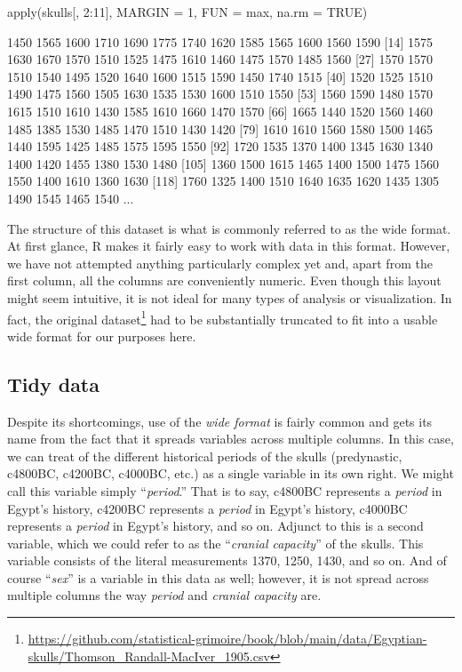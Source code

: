 \begin{inR}
apply(skulls[, 2:11], MARGIN = 1, FUN = max, na.rm = TRUE)
\end{inR}

\begin{outR}
  [1] 1450 1565 1600 1710 1690 1775 1740 1620 1585 1565 1600 1560 1590
 [14] 1575 1630 1670 1570 1510 1525 1475 1610 1460 1475 1570 1485 1560
 [27] 1570 1570 1510 1540 1495 1520 1640 1600 1515 1590 1450 1740 1515
 [40] 1520 1525 1510 1490 1475 1560 1505 1630 1535 1530 1600 1510 1550
 [53] 1560 1590 1480 1570 1615 1510 1610 1430 1585 1610 1660 1470 1570
 [66] 1665 1440 1520 1560 1460 1485 1385 1530 1485 1470 1510 1430 1420
 [79] 1610 1610 1560 1580 1500 1465 1440 1595 1425 1485 1575 1595 1550
 [92] 1720 1535 1370 1400 1345 1630 1340 1400 1420 1455 1380 1530 1480
[105] 1360 1500 1615 1465 1400 1500 1475 1560 1550 1400 1610 1360 1630
[118] 1760 1325 1400 1510 1640 1635 1620 1435 1305 1490 1545 1465 1540
...
\end{outR}

The structure of this dataset is what is commonly referred to as the \gls{wide format}. At first glance, R makes it fairly easy to work with data in this format. However, we have not attempted anything particularly complex yet and, apart from the first column, all the columns are conveniently numeric. Even though this layout might seem intuitive, it is not ideal for many types of analysis or visualization. In fact, the original dataset\footnote{\url{https://github.com/statistical-grimoire/book/blob/main/data/Egyptian-skulls/Thomson_Randall-MacIver_1905.csv}} had to be substantially truncated to fit into a usable wide format for our purposes here.

\clearpage

\subsection{Tidy data}

Despite its shortcomings, use of the \textit{wide format} is fairly common and gets its name from the fact that it spreads variables across multiple columns. In this case, we can treat of the different historical periods of the skulls (predynastic, c4800BC, c4200BC, c4000BC, etc.) as a single variable in its own right. We might call this variable simply ``\textit{period}.'' That is to say, c4800BC represents a \textit{period} in Egypt's history, c4200BC represents a \textit{period} in Egypt's history, c4000BC represents a \textit{period} in Egypt's history, and so on. Adjunct to this is a second variable, which we could refer to as the ``\textit{cranial capacity}'' of the skulls. This variable consists of the literal measurements 1370, 1250, 1430, and so on. And of course ``\textit{sex}'' is a variable in this data as well; however, it is not spread across multiple columns the way \textit{period} and \textit{cranial capacity} are. 

